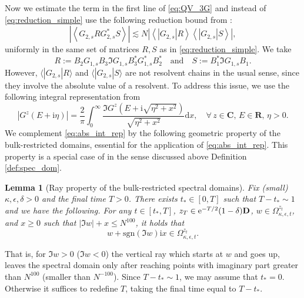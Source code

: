 \documentclass[10pt]{amsart}
\newtheorem{lemma}[theorem]{Lemma}
\numberwithin{equation}{section}
\newcommand{\dif}{\mathrm{d}}
\newcommand{\R}{\mathbf{R}}
\newcommand{\C}{\mathbf{C}}
\newcommand{\ii}{\mathrm{i}}
\newcommand{\ee}{\mathrm{e}}
\begin{document}
Now we estimate the term in the first line of \eqref{eq:QV_3G} and instead of \eqref{eq:reduction_simple} use the following reduction bound from \cite[Eq.(5.27)]{eigenv_decorr}:  
\begin{equation}
\left\vert\left\langle G_{2,s}RG_{2,s}^*S\right\rangle\right\vert \lesssim N\left\vert \left\langle |G_{2,s}|R\right\rangle \left\langle |G_{2,s}|S\right\rangle\right\vert,
\label{eq:reduction}
\end{equation}
uniformly in the same set of matrices $R,S$ as in \eqref{eq:reduction_simple}. We take
\begin{equation}
R:= B_2G_{1,s}B_3\Im G_{1,s}B_3^*G_{1,s}^*B_2^*\quad \text{and}\quad S:= B_1^*\Im G_{1,s} B_1.
\label{eq:def_RS_QV3}
\end{equation}
However, $\langle |G_{2,s}|R\rangle$ and $\langle |G_{2,s}|S\rangle$ are not resolvent chains in the usual sense, since they involve the absolute value of a resolvent. To address this issue, we use the following integral representation from \cite[Eq.(5.4)]{Multi_res_llaws}
\begin{equation}
|G^z(E+\ii\eta)| = \frac{2}{\pi} \int_0^\infty \frac{\Im G^z(E+\ii\sqrt{\eta^2+x^2})}{\sqrt{\eta^2+x^2}}\dif x,\quad \forall\,z\in\C,\, E\in\R,\, \eta>0. 
\label{eq:abs_int_rep}
\end{equation}
We complement \eqref{eq:abs_int_rep} by the following geometric property of the bulk-restricted domains, essential for the application of \eqref{eq:abs_int_rep}. This property is a special case of \cite[Lemma 5.4]{eigenv_decorr} in the sense discussed above Definition \ref{def:spec_dom}.


\begin{lemma}[Ray property of the bulk-restricted spectral domains]\label{lem:ray_property} Fix (small) $\kappa, \epsilon ,\delta>0$ and the final time $T>0$. There exists $t_*\in [0,T]$ such that $T-t_*\sim 1$ and we have the following. For any $t\in [t_*,T]$, $z_T\in \ee^{-T/2}(1-\delta)\bf{D}$, $w\in \Omega^{z_t}_{\kappa,\epsilon,t}$, and $x\ge 0$ such that $|\Im w|+x\le N^{100}$, it holds that
\begin{equation*}
w+\mathrm{sgn}(\Im w)\ii x\in \Omega^{z_t}_{\kappa,\epsilon,t}.
\end{equation*}
\end{lemma}

That is, for $\Im w>0$ ($\Im w<0$) the vertical ray which starts at $w$ and goes up, leaves the spectral domain only after reaching points with imaginary part greater than $N^{100}$ (smaller than $N^{-100}$). Since $T-t_*\sim 1$, we may assume that $t_*=0$. Otherwise it suffices to redefine $T$, taking the final time equal to $T-t_*$. 
\end{document}
